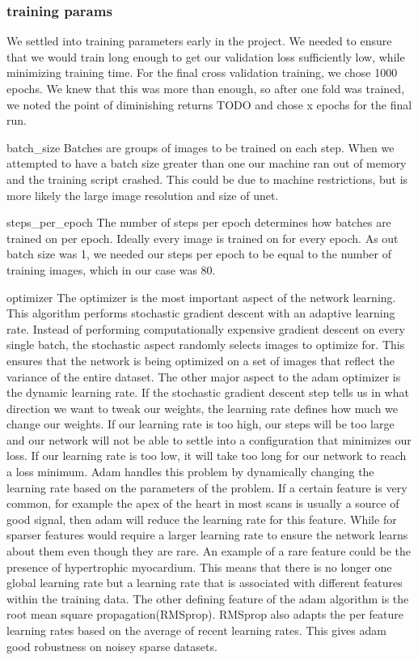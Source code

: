 \documentclass[12pt]{article}
\begin{document}
\subsubsection{training params}
We settled into training parameters early in the project.
We needed to ensure that we would train long enough to get our validation loss sufficiently low, while minimizing training time.
For the final cross validation training, we chose 1000 epochs.
We knew that this was more than enough, so after one fold was trained, we noted the point of diminishing returns TODO and chose x epochs for the final run.

batch\_size
Batches are groups of images to be trained on each step.
When we attempted to have a batch size greater than one our machine ran out of memory and the training script crashed.
This could be due to machine restrictions, but is more likely the large image resolution and size of unet.

steps\_per\_epoch
The number of steps per epoch determines how batches are trained on per epoch.
Ideally every image is trained on for every epoch.
As out batch size was 1, we needed our steps per epoch to be equal to the number of training images, which in our case was 80.

optimizer
The optimizer is the most important aspect of the network learning.
This algorithm performs stochastic gradient descent with an adaptive learning rate.
Instead of performing computationally expensive gradient descent on every single batch, the stochastic aspect randomly selects images to optimize for.
This ensures that the network is being optimized on a set of images that reflect the variance of the entire dataset.
The other major aspect to the adam optimizer is the dynamic learning rate.
If the stochastic gradient descent step tells us in what direction we want to tweak our weights, the learning rate defines how much we change our weights.
If our learning rate is too high, our steps will be too large and our network will not be able to settle into a configuration that minimizes our loss.
If our learning rate is too low, it will take too long for our network to reach a loss minimum.
Adam handles this problem by dynamically changing the learning rate based on the parameters of the problem.
If a certain feature is very common, for example the apex of the heart in most scans is usually a source of good signal, then adam will reduce the learning rate for this feature.
While for sparser features would require a larger learning rate to ensure the network learns about them even though they are rare.
An example of a rare feature could be the presence of hypertrophic myocardium.
This means that there is no longer one global learning rate but a learning rate that is associated with different features within the training data.
The other defining feature of the adam algorithm is the root mean square propagation(RMSprop).
RMSprop also adapts the per feature learning rates based on the average of recent learning rates.
This gives adam good robustness on noisey sparse datasets.\cite{adam_opt}
\end{document}
